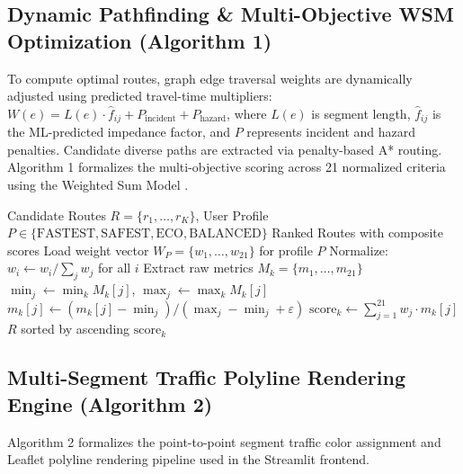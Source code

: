 \documentclass[journal]{IEEEtran}
\begin{document}
\subsection{Dynamic Pathfinding \& Multi-Objective WSM Optimization (Algorithm 1)}
To compute optimal routes, graph edge traversal weights are dynamically adjusted using predicted travel-time multipliers: $W(e) = L(e) \cdot \hat{f}_{ij} + P_{\text{incident}} + P_{\text{hazard}}$, where $L(e)$ is segment length, $\hat{f}_{ij}$ is the ML-predicted impedance factor, and $P$ represents incident and hazard penalties. Candidate diverse paths are extracted via penalty-based A* routing. Algorithm 1 formalizes the multi-objective scoring across 21 normalized criteria using the Weighted Sum Model \cite{ref32}.

\begin{algorithm}[h]
\caption{WSM Multi-Objective Path Scoring}
\begin{algorithmic}[1]
\REQUIRE Candidate Routes $R = \{r_1, \dots, r_K\}$, User Profile $P \in \{\text{FASTEST}, \text{SAFEST}, \text{ECO}, \text{BALANCED}\}$
\ENSURE Ranked Routes with composite scores
\STATE Load weight vector $W_P = \{w_1, \dots, w_{21}\}$ for profile $P$
\STATE Normalize: $w_i \leftarrow w_i / \sum_{j} w_j$ for all $i$
    \STATE Extract raw metrics $M_k = \{m_1, \dots, m_{21}\}$
\ENDFOR
{}
    \STATE $\min_j \leftarrow \min_{k} M_k[j]$, $\max_j \leftarrow \max_{k} M_k[j]$
        \STATE $m_k[j] \leftarrow (m_k[j] - \min_j) / (\max_j - \min_j + \varepsilon)$
    \ENDFOR
\ENDFOR
{}
    \STATE $\text{score}_k \leftarrow \sum_{j=1}^{21} w_j \cdot m_k[j]$
\ENDFOR
\RETURN $R$ sorted by ascending $\text{score}_k$
\end{algorithmic}
\end{algorithm}

\subsection{Multi-Segment Traffic Polyline Rendering Engine (Algorithm 2)}
Algorithm 2 formalizes the point-to-point segment traffic color assignment and Leaflet polyline rendering pipeline used in the Streamlit frontend.
\end{document}
